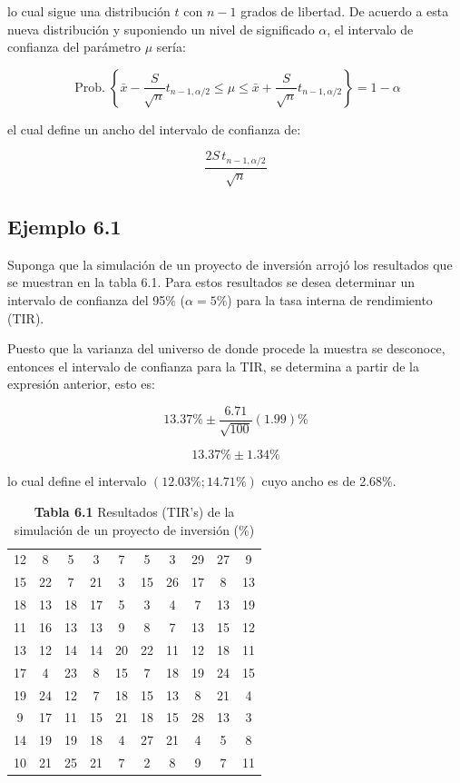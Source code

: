 \documentclass[11pt,letterpaper]{report}
\newcommand{\Prob}{\operatorname{Prob.}}
\begin{document}
lo cual sigue una distribución $t$ con $n-1$ grados de libertad. De
acuerdo a esta nueva distribución y suponiendo un nivel de significado
$\alpha$, el intervalo de confianza del parámetro $\mu$ sería:

\begin{equation}
\Prob\left\{ \bar{x} - \frac{S}{\sqrt{n}}t_{n-1,\alpha/2} \le \mu \le \bar{x} + \frac{S}{\sqrt{n}}t_{n-1,\alpha/2} \right\} = 1 - \alpha
\end{equation}

el cual define un ancho del intervalo de confianza de:

\begin{equation}
\frac{2S\,t_{n-1,\alpha/2}}{\sqrt{n}}
\end{equation}

\subsection*{Ejemplo 6.1}

Suponga que la simulación de un proyecto de inversión arrojó los
resultados que se muestran en la tabla 6.1. Para estos resultados se
desea determinar un intervalo de confianza del 95\% ($\alpha=5\%$) para
la tasa interna de rendimiento (TIR).

Puesto que la varianza del universo de donde procede la muestra se
desconoce, entonces el intervalo de confianza para la TIR, se determina
a partir de la expresión anterior, esto es:

\[
13.37\% \pm \frac{6.71}{\sqrt{100}}(1.99)\%
\]

\[
13.37\% \pm 1.34\%
\]

lo cual define el intervalo $(12.03\%;14.71\%)$ cuyo ancho es de
2.68\%.

\begin{table}[H]
\centering
\caption*{\textbf{Tabla 6.1} Resultados (TIR's) de la simulación de un proyecto de inversión (\%)}
\begin{tabular}{cccccccccc}
\toprule
12 & 8 & 5 & 3 & 7 & 5 & 3 & 29 & 27 & 9 \\
15 & 22 & 7 & 21 & 3 & 15 & 26 & 17 & 8 & 13 \\
18 & 13 & 18 & 17 & 5 & 3 & 4 & 7 & 13 & 19 \\
11 & 16 & 13 & 13 & 9 & 8 & 7 & 13 & 15 & 12 \\
13 & 12 & 14 & 14 & 20 & 22 & 11 & 12 & 18 & 11 \\
17 & 4 & 23 & 8 & 15 & 7 & 18 & 19 & 24 & 15 \\
19 & 24 & 12 & 7 & 18 & 15 & 13 & 8 & 21 & 4 \\
9 & 17 & 11 & 15 & 21 & 18 & 15 & 28 & 13 & 3 \\
14 & 19 & 19 & 18 & 4 & 27 & 21 & 4 & 5 & 8 \\
10 & 21 & 25 & 21 & 7 & 2 & 8 & 9 & 7 & 11 \\
\bottomrule
\end{tabular}
\end{table}
\end{document}
